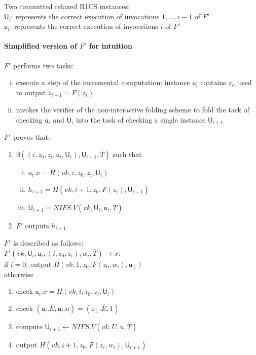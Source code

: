 \documentclass{article}
\theoremstyle{definition}
\begin{document}
\vspace{0.5cm}
Two committed relaxed R1CS instances:\\
$\mathsf{U}_i$: represents the correct execution of invocations $1, \ldots, i-1$ of $F'$\\
$\mathsf{u}_i$: represents the correct execution of invocations $i$ of $F'$

\paragraph{Simplified version of $F'$ for intuition}
\vspace{0.5cm}
$F'$ performs two tasks:
\begin{enumerate}[i.]
	\item execute a step of the incremental computation:
		instance $\mathsf{u}_i$ contains $z_i$, used to output $z_{i+1}=F(z_i)$
	\item invokes the verifier of the non-interactive folding scheme to fold the task of checking $\mathsf{u}_i$ and $\mathsf{U}_i$ into the task of checking a single instance $\mathsf{U}_{i+1}$
\end{enumerate}

\vspace{0.5cm}
$F'$ proves that:
\begin{enumerate}
	\item $\exists ( (i, z_0, z_i, \mathsf{u}_i, \mathsf{U}_i), \mathsf{U}_{i+1}, \overline{T})$ such that
	\begin{enumerate}[i.]
		\item $\mathsf{u}_i.x = H(vk, i, z_0, z_i, \mathsf{U}_i)$
		\item $h_{i+1} = H(vk, i+1, z_0, F(z_i), \mathsf{U}_{i+1})$
		\item $\mathsf{U}_{i+1} = NIFS.V(vk, \mathsf{U}_i, \mathsf{u}_i, \overline{T})$
	\end{enumerate}
\item $F'$ outputs $h_{i+1}$
\end{enumerate}


$F'$ is described as follows:\\
$F'(vk, \mathsf{U}_i, \mathsf{u}_i, (i, z_0, z_i), w_i, \overline{T}) \rightarrow x$:\\
if $i=0$, output $H(vk, 1, z_0, F(z_0, w_i), \mathsf{u}_{\bot})$\\
otherwise
\begin{enumerate}
	\item check $\mathsf{u}_i.x = H(vk, i, z_0, z_i, \mathsf{U}_i)$
	\item check $(\mathsf{u}_i.\overline{E}, \mathsf{u}_i.u) = (\mathsf{u}_{\bot}.\overline{E}, 1)$
	\item compute $\mathsf{U}_{i+1} \leftarrow NIFS.V(vk, U, u, \overline{T})$
	\item output $H(vk, i+1, z_0, F(z_i, w_i), \mathsf{U}_{i+1})$
\end{enumerate}
\end{document}
